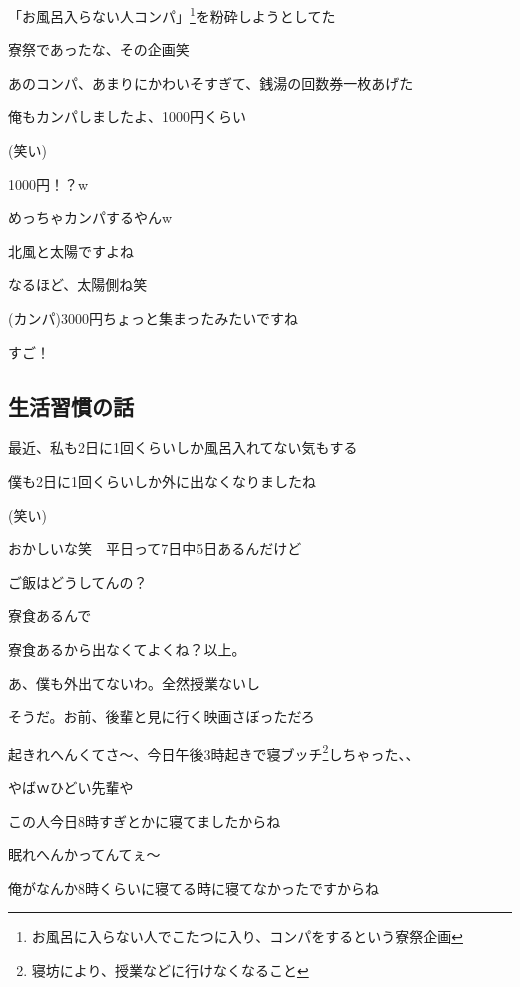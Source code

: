 \begin{multicols}{2}
「お風呂入らない人コンパ」\footnote{お風呂に入らない人でこたつに入り、コンパをするという寮祭企画}を粉砕しようとしてた

寮祭であったな、その企画笑

あのコンパ、あまりにかわいそすぎて、銭湯の回数券一枚あげた

俺もカンパしましたよ、1000円くらい

(笑い)

1000円！？w

めっちゃカンパするやんw

北風と太陽ですよね

なるほど、太陽側ね笑

(カンパ)3000円ちょっと集まったみたいですね

すご！

\subsection{生活習慣の話}

最近、私も2日に1回くらいしか風呂入れてない気もする

僕も2日に1回くらいしか外に出なくなりましたね

(笑い)

おかしいな笑　平日って7日中5日あるんだけど

ご飯はどうしてんの？

寮食あるんで

寮食あるから出なくてよくね？以上。

あ、僕も外出てないわ。全然授業ないし

そうだ。お前、後輩と見に行く映画さぼっただろ

起きれへんくてさ〜、今日午後3時起きで寝ブッチ\footnote{寝坊により、授業などに行けなくなること}しちゃった、、

やばｗひどい先輩や

この人今日8時すぎとかに寝てましたからね

眠れへんかってんてぇ〜

俺がなんか8時くらいに寝てる時に寝てなかったですからね


\end{multicols}
